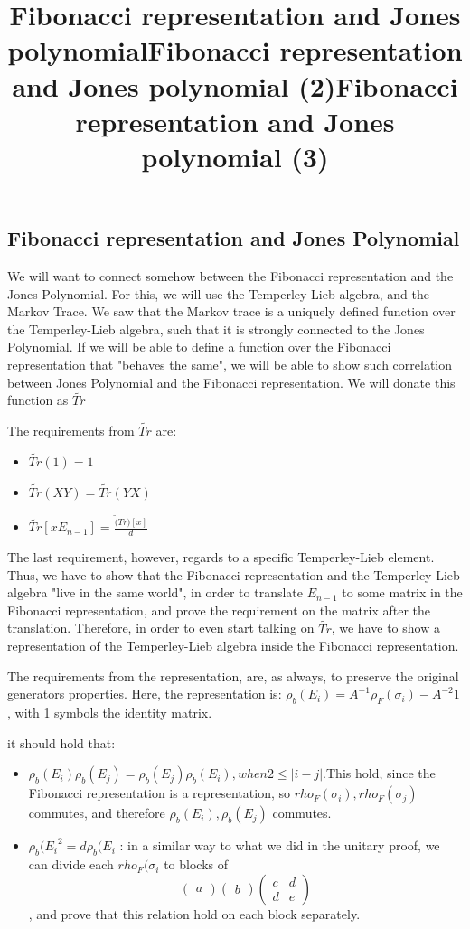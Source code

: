 \documentclass{article}
\begin{document}
\subsection{Fibonacci representation and Jones Polynomial}
\title{Fibonacci representation and Jones polynomial}
We will want to connect somehow between the Fibonacci representation and the Jones Polynomial.
For this, we will use the Temperley-Lieb algebra, and the Markov Trace. We saw that the Markov trace
is a uniquely defined function over the Temperley-Lieb algebra, such that it is strongly connected to the Jones Polynomial. If we will be able to define a function over the Fibonacci representation that "behaves the same", we will be able to show such correlation between Jones Polynomial and the Fibonacci representation. We will donate this function as $\tilde{Tr}$


\title{Fibonacci representation and Jones polynomial (2)}
The requirements from  $\tilde{Tr}$ are:
\begin{itemize}
\item $\tilde{Tr}(1) = 1$
\item $\tilde{Tr}(XY) = \tilde{Tr}(YX)$
\item  $ \tilde{Tr}[xE_{n-1}]=\frac{\tilde(Tr)[x]}{d}$    
\end{itemize}
The last requirement, however, regards to a specific Temperley-Lieb element. Thus, we have to show that the Fibonacci representation and the Temperley-Lieb algebra "live in the same world", in order to translate $E_{n-1}$ to some matrix in the Fibonacci representation, and prove the requirement on the matrix after the translation. Therefore, in order to even start talking on $\tilde{Tr}$, we have to show a representation of the Temperley-Lieb algebra inside the Fibonacci representation.  


\title{Fibonacci representation and Jones polynomial (3)}
The requirements from the representation, are, as always, to preserve the original generators properties.
Here, the representation is: $\rho_{b}(E_{i}) = A^{-1}\rho_{F}(\sigma_{i}) - A^{-2}1$ , with 1 symbols the identity matrix.

it should hold that:
\begin{itemize}
\item $\rho_{b}(E_{i})\rho_{b}(E_{j}) = \rho_{b}(E_{j})\rho_{b}(E_{i}), when 2 \leq |i-j|$.This hold, since the Fibonacci representation is a representation, so $rho_{F}(\sigma_{i}),rho_{F}(\sigma_{j})$ commutes, and therefore $\rho_{b}(E_{i}),\rho_{b}(E_{j})$ commutes.
\item  ${\rho_{b}(E_{i}}^{2} = d\rho_{b}(E_{i}$ : in a similar way to what we did in the unitary proof, we can divide each  $rho_{F}(\sigma_{i}$ to blocks of
\[
\begin{pmatrix} a \end{pmatrix}
\begin{pmatrix} b \end{pmatrix}
\begin{pmatrix} c & d \\ d & e \end{pmatrix}
\], and prove that this relation hold on each block separately.  
\end{itemize}
\end{document}
